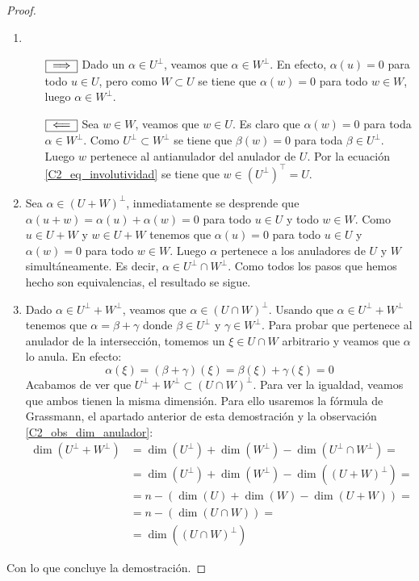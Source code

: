 \begin{proof}
	\begin{enumerate}
		\item \ \ \begin{itemize}
			\item[$\fbox{$\implies$}$] Dado un $\alpha\in U^\perp$, veamos que $\alpha\in W^\perp$. En efecto, $\alpha(u)=0$ para todo $u\in U$, pero como $W\subset U$ se tiene que $\alpha(w)=0$ para todo $w\in W$, luego $\alpha\in W^\perp$.
			
			\item[$\fbox{$\impliedby$}$] Sea $w\in W$, veamos que $w\in U$. Es claro que $\alpha(w)=0$ para toda $\alpha \in W^{\perp}$. Como $U^{\perp}\subset W^{\perp}$ se tiene que $\beta (w)=0$ para toda $\beta\in U^{\perp}$. Luego $w$ pertenece al antianulador del anulador de $U$. Por la ecuación \eqref{C2_eq_involutividad} se tiene que $w\in (U^\perp)^\top=U$.
		\end{itemize}
		
		
		\item Sea $\alpha\in(U+W)^\perp$, inmediatamente se desprende que $\alpha(u+w)=\alpha(u)+\alpha(w)=0$ para todo $u\in U$ y todo $w\in W$. Como $u\in U+W$ y $w\in U+W$ tenemos que $\alpha(u)=0$ para todo $u\in U$ y $\alpha(w)=0$ para todo $w\in W$. Luego $\alpha$ pertenece a los anuladores de $U$ y $W$ simultáneamente. Es decir, $\alpha\in U^\perp\cap W^\perp$. Como todos los pasos que hemos hecho son equivalencias, el resultado se sigue.
		\item Dado $\alpha\in U^\perp + W^\perp$, veamos que $\alpha\in (U\cap W)^\perp$. Usando que $\alpha\in U^\perp + W^\perp$ tenemos que $\alpha=\beta+\gamma$ donde $\beta\in U^\perp$ y $\gamma\in W^\perp$. Para probar que pertenece al anulador de la intersección, tomemos un $\xi\in U\cap W$ arbitrario y veamos que $\alpha$ lo anula. En efecto:
		\[\alpha(\xi)=(\beta+\gamma)(\xi)=\beta(\xi)+\gamma(\xi)=0\]
		Acabamos de ver que $U^\perp+W^\perp\subset(U\cap W)^\perp$. Para ver la igualdad, veamos que ambos tienen la misma dimensión. Para ello usaremos la fórmula de Grassmann, el apartado anterior de esta demostración y la observación \ref{C2_obs_dim_anulador}:
		\begin{align}
			\dim(U^\perp+W^\perp)&=\dim(U^\perp)+\dim(W^\perp)-\dim(U^\perp\cap W^\perp)=\\
			&=\dim(U^\perp)+\dim(W^\perp)-\dim((U+ W)^\perp)=\\
			&=n-(\dim(U)+\dim(W)-\dim(U+W))=\\
			&=n-(\dim(U\cap W))=\\
			&=\dim((U\cap W)^\perp)
		\end{align}
	\end{enumerate}
	Con lo que concluye la demostración.
\end{proof}

